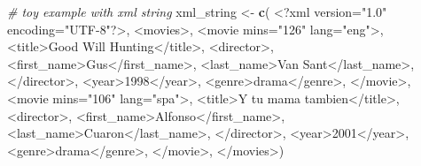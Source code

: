 \documentclass[
]{book}
\newenvironment{Shaded}{\begin{snugshade}}{\end{snugshade}}
\newcommand{\CommentTok}[1]{\textcolor[rgb]{0.56,0.35,0.01}{\textit{#1}}}
\newcommand{\FunctionTok}[1]{\textcolor[rgb]{0.13,0.29,0.53}{\textbf{#1}}}
\newcommand{\NormalTok}[1]{#1}
\newcommand{\OtherTok}[1]{\textcolor[rgb]{0.56,0.35,0.01}{#1}}
\newcommand{\StringTok}[1]{\textcolor[rgb]{0.31,0.60,0.02}{#1}}
\begin{document}
\begin{Shaded}
\begin{Highlighting}[]
\CommentTok{\# toy example with xml string}
\NormalTok{xml\_string }\OtherTok{\textless{}{-}} \FunctionTok{c}\NormalTok{(}
  \StringTok{\textquotesingle{}\textless{}?xml version="1.0" encoding="UTF{-}8"?\textgreater{}\textquotesingle{}}\NormalTok{,}
  \StringTok{\textquotesingle{}\textless{}movies\textgreater{}\textquotesingle{}}\NormalTok{,}
  \StringTok{\textquotesingle{}\textless{}movie mins="126" lang="eng"\textgreater{}\textquotesingle{}}\NormalTok{,}
  \StringTok{\textquotesingle{}\textless{}title\textgreater{}Good Will Hunting\textless{}/title\textgreater{}\textquotesingle{}}\NormalTok{,}
  \StringTok{\textquotesingle{}\textless{}director\textgreater{}\textquotesingle{}}\NormalTok{,}
  \StringTok{\textquotesingle{}\textless{}first\_name\textgreater{}Gus\textless{}/first\_name\textgreater{}\textquotesingle{}}\NormalTok{,}
  \StringTok{\textquotesingle{}\textless{}last\_name\textgreater{}Van Sant\textless{}/last\_name\textgreater{}\textquotesingle{}}\NormalTok{,}
  \StringTok{\textquotesingle{}\textless{}/director\textgreater{}\textquotesingle{}}\NormalTok{,}
  \StringTok{\textquotesingle{}\textless{}year\textgreater{}1998\textless{}/year\textgreater{}\textquotesingle{}}\NormalTok{,}
  \StringTok{\textquotesingle{}\textless{}genre\textgreater{}drama\textless{}/genre\textgreater{}\textquotesingle{}}\NormalTok{,}
  \StringTok{\textquotesingle{}\textless{}/movie\textgreater{}\textquotesingle{}}\NormalTok{,}
  \StringTok{\textquotesingle{}\textless{}movie mins="106" lang="spa"\textgreater{}\textquotesingle{}}\NormalTok{,}
  \StringTok{\textquotesingle{}\textless{}title\textgreater{}Y tu mama tambien\textless{}/title\textgreater{}\textquotesingle{}}\NormalTok{,}
  \StringTok{\textquotesingle{}\textless{}director\textgreater{}\textquotesingle{}}\NormalTok{,}
  \StringTok{\textquotesingle{}\textless{}first\_name\textgreater{}Alfonso\textless{}/first\_name\textgreater{}\textquotesingle{}}\NormalTok{,}
  \StringTok{\textquotesingle{}\textless{}last\_name\textgreater{}Cuaron\textless{}/last\_name\textgreater{}\textquotesingle{}}\NormalTok{,}
  \StringTok{\textquotesingle{}\textless{}/director\textgreater{}\textquotesingle{}}\NormalTok{,}
  \StringTok{\textquotesingle{}\textless{}year\textgreater{}2001\textless{}/year\textgreater{}\textquotesingle{}}\NormalTok{,}
  \StringTok{\textquotesingle{}\textless{}genre\textgreater{}drama\textless{}/genre\textgreater{}\textquotesingle{}}\NormalTok{,}
  \StringTok{\textquotesingle{}\textless{}/movie\textgreater{}\textquotesingle{}}\NormalTok{,}
  \StringTok{\textquotesingle{}\textless{}/movies\textgreater{}\textquotesingle{}}\NormalTok{)}
\end{Highlighting}
\end{Shaded}
\end{document}
